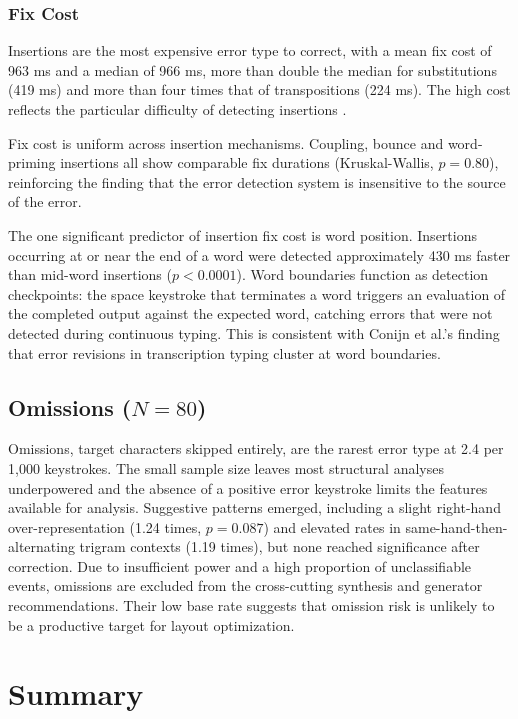 \documentclass[12pt]{article}
\begin{document}
\subsubsection{Fix Cost}

Insertions are the most expensive error type to correct, with a mean fix cost of 963 ms and a median of 966 ms, more than double the median for substitutions (419 ms) and more than four times that of transpositions (224 ms). The high cost reflects the particular difficulty of detecting insertions \citep{logan2010}.

Fix cost is uniform across insertion mechanisms. Coupling, bounce and word-priming insertions all show comparable fix durations (Kruskal-Wallis, $p = 0.80$), reinforcing the finding that the error detection system is insensitive to the source of the error.

The one significant predictor of insertion fix cost is word position. Insertions occurring at or near the end of a word were detected approximately 430 ms faster than mid-word insertions ($p < 0.0001$). Word boundaries function as detection checkpoints: the space keystroke that terminates a word triggers an evaluation of the completed output against the expected word, catching errors that were not detected during continuous typing. This is consistent with Conijn et al.'s \citep{conijn2019} finding that error revisions in transcription typing cluster at word boundaries.

\subsection{Omissions ($N = 80$)}

Omissions, target characters skipped entirely, are the rarest error type at 2.4 per 1,000 keystrokes. The small sample size leaves most structural analyses underpowered and the absence of a positive error keystroke limits the features available for analysis. Suggestive patterns emerged, including a slight right-hand over-representation (1.24 times, $p = 0.087$) and elevated rates in same-hand-then-alternating trigram contexts (1.19 times), but none reached significance after correction. Due to insufficient power and a high proportion of unclassifiable events, omissions are excluded from the cross-cutting synthesis and generator recommendations. Their low base rate suggests that omission risk is unlikely to be a productive target for layout optimization.

\section{Summary}
\end{document}

